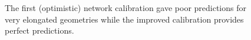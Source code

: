 \begin{figure}[htpb]
{\begin{minipage}{0.8\linewidth}
                \end{minipage}%
                \begin{minipage}{0.2\linewidth}
                \end{minipage}
            }
            \caption{The first (optimistic) network calibration gave poor
              predictions for very elongated geometries while the improved
              calibration provides perfect predictions.}
            \label{fig:validation_geometry_global}
        \end{figure}

